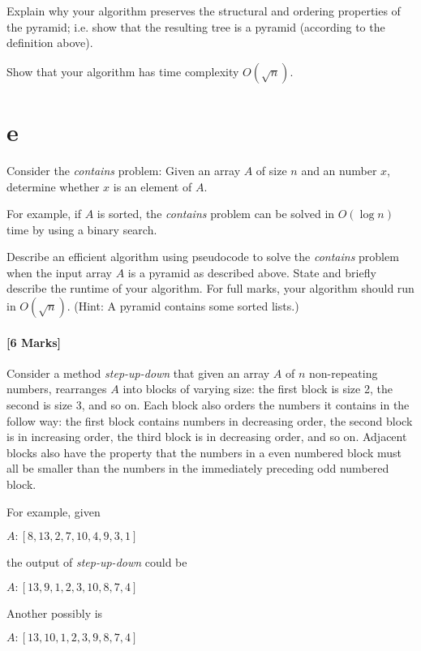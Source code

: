 \documentclass[12pt]{article}
\begin{document}
\begin{itemize}
		Explain why your algorithm preserves the structural and ordering properties
		of the pyramid; i.e. show that the resulting tree is a pyramid (according to
		the definition above).
		
		Show that your algorithm has time complexity $O(\sqrt{n})$.
		
		\part{e}
		Consider the \emph{contains} problem: Given an array $A$ of size $n$
		and an number $x$, determine whether $x$ is an element of $A$.
		
		For example, if $A$ is sorted, the \emph{contains} problem can be solved in
		$O(\log n)$ time by using a binary search.
		
		Describe an efficient algorithm using pseudocode to solve the \emph{contains} problem when the input array $A$ is a pyramid as described above.  
		State and briefly describe the runtime of your algorithm.
		For full marks, your algorithm should run in $O(\sqrt{n})$.
		(Hint: A pyramid contains some sorted lists.)
		
	\end{itemize}
	
	\subsection{[6 Marks]}
	
	Consider a method \emph{step-up-down} that given an array $A$ of $n$ non-repeating numbers, rearranges $A$ into blocks of varying size: the first block is size 2, the second is size 3, and so on.  Each block also orders the numbers it contains in the follow way: the first block contains numbers in decreasing order, the second block is in increasing order, the third block is in decreasing order, and so on. Adjacent blocks also have the property that the numbers in a even numbered block must all be smaller than the numbers in the immediately preceding odd numbered block.
	
	For example, given
	\begin{center}
		$A: [8,13,2,7,10,4,9,3,1]$
	\end{center}
	the output of \emph{step-up-down} could be
	\begin{center}
		$A: [13, 9, 1, 2, 3, 10, 8, 7, 4]$
	\end{center}
	Another possibly is
	\begin{center}
		$A: [13, 10, 1, 2, 3, 9, 8, 7, 4]$
	\end{center}
	
\end{document}
